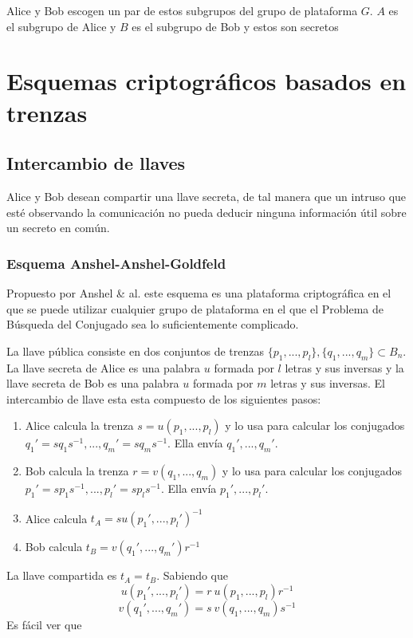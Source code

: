 \documentclass[12pt]{article}
\theoremstyle{definition}
\begin{document}
Alice y Bob escogen un par de estos subgrupos del grupo de plataforma $G$. $A$ es el subgrupo de Alice y $B$ es el subgrupo de Bob y estos son secretos



\section{Esquemas criptográficos basados en trenzas}

\subsection{Intercambio de llaves}
Alice y Bob desean compartir una llave secreta, de tal manera que un intruso que esté observando la comunicación no pueda deducir ninguna información útil sobre un secreto en común.
\subsubsection{Esquema Anshel-Anshel-Goldfeld}
Propuesto por Anshel \& al. este esquema es una plataforma criptográfica en el que se puede utilizar cualquier grupo de plataforma en el que el Problema de Búsqueda del Conjugado sea lo suficientemente complicado.

La llave pública consiste en dos conjuntos de trenzas $\{p_1,...,p_l\},\{q_1,...,q_m\}\subset B_n$. La llave secreta de Alice es una palabra $u$ formada por $l$ letras y sus inversas y la llave secreta de Bob es una palabra $u$ formada por $m$ letras y sus inversas. El intercambio de llave esta esta compuesto de los siguientes pasos:

\begin{enumerate}
\item Alice calcula la trenza $s = u(p_1,...,p_l)$ y lo usa para calcular los conjugados $q_1'=sq_1s^{-1},...,q_m'=sq_ms^{-1}$. Ella envía $q_1',...,q_m'.$
\item Bob calcula la trenza $r = v(q_1,...,q_m)$ y lo usa para calcular los conjugados $p_1'=sp_1s^{-1},...,p_l'=sp_ls^{-1}$. Ella envía $p_1',...,p_l'.$
\item Alice calcula $t_A = su(p_1',...,p_l')^{-1}$
\item Bob calcula $t_B = v(q_1',...,q_m')r^{-1}$
\end{enumerate}

La llave compartida es $t_A = t_B$. Sabiendo que 
$$u(p_1',...,p_l')=r\ u(p_1,...,p_l)r^{-1}$$
$$v(q_1',...,q_m')=s\ v(q_1,...,q_m)s^{-1}$$
Es fácil ver que
\end{document}
